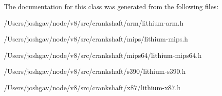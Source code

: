 The documentation for this class was generated from the following files\+:\begin{DoxyCompactItemize}
\item 
/\+Users/joshgav/node/v8/src/crankshaft/arm/lithium-\/arm.\+h\item 
/\+Users/joshgav/node/v8/src/crankshaft/mips/lithium-\/mips.\+h\item 
/\+Users/joshgav/node/v8/src/crankshaft/mips64/lithium-\/mips64.\+h\item 
/\+Users/joshgav/node/v8/src/crankshaft/s390/lithium-\/s390.\+h\item 
/\+Users/joshgav/node/v8/src/crankshaft/x87/lithium-\/x87.\+h\end{DoxyCompactItemize}
